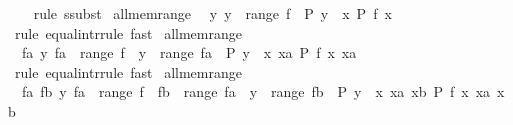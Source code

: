 \begin{isabellebody}
%
\isadelimproof
\ \ %
\endisadelimproof
%
\isatagproof
{}\isamarkupfalse%
\ {\isacharparenleft}{\kern0pt}rule\ ssubst{\isacharparenright}{\kern0pt}%
\endisatagproof
{\isafoldproof}%
%
\isadelimproof
\isanewline
%
\endisadelimproof
\isanewline
{}\isamarkupfalse%
\ all{\isacharunderscore}{\kern0pt}mem{\isacharunderscore}{\kern0pt}range{}{\isacharcolon}{\kern0pt}\isanewline
\ \ {\isachardoublequoteopen}{\isacharparenleft}{\kern0pt}{\isasymAnd}y{\isachardot}{\kern0pt}\ y\ {\isasymin}\ range\ f\ {\isasymLongrightarrow}\ P\ y{\isacharparenright}{\kern0pt}\ {\isasymequiv}\ {\isacharparenleft}{\kern0pt}{\isasymAnd}x{\isachardot}{\kern0pt}\ P\ {\isacharparenleft}{\kern0pt}f\ x{\isacharparenright}{\kern0pt}{\isacharparenright}{\kern0pt}\ {\isachardoublequoteclose}\isanewline
%
\isadelimproof
\ \ %
\endisadelimproof
%
\isatagproof
{}\isamarkupfalse%
\ {\isacharparenleft}{\kern0pt}rule\ equal{\isacharunderscore}{\kern0pt}intr{\isacharunderscore}{\kern0pt}rule{\isacharparenright}{\kern0pt}\ fast{\isacharplus}{\kern0pt}%
\endisatagproof
{\isafoldproof}%
%
\isadelimproof
\isanewline
%
\endisadelimproof
\isanewline
{}\isamarkupfalse%
\ all{\isacharunderscore}{\kern0pt}mem{\isacharunderscore}{\kern0pt}range{}{\isacharcolon}{\kern0pt}\isanewline
\ \ {\isachardoublequoteopen}{\isacharparenleft}{\kern0pt}{\isasymAnd}fa\ y{\isachardot}{\kern0pt}\ fa\ {\isasymin}\ range\ f\ {\isasymLongrightarrow}\ y\ {\isasymin}\ range\ fa\ {\isasymLongrightarrow}\ P\ y{\isacharparenright}{\kern0pt}\ {\isasymequiv}\ {\isacharparenleft}{\kern0pt}{\isasymAnd}x\ xa{\isachardot}{\kern0pt}\ P\ {\isacharparenleft}{\kern0pt}f\ x\ xa{\isacharparenright}{\kern0pt}{\isacharparenright}{\kern0pt}{\isachardoublequoteclose}\isanewline
%
\isadelimproof
\ \ %
\endisadelimproof
%
\isatagproof
{}\isamarkupfalse%
\ {\isacharparenleft}{\kern0pt}rule\ equal{\isacharunderscore}{\kern0pt}intr{\isacharunderscore}{\kern0pt}rule{\isacharparenright}{\kern0pt}\ fast{\isacharplus}{\kern0pt}%
\endisatagproof
{\isafoldproof}%
%
\isadelimproof
\isanewline
%
\endisadelimproof
\isanewline
{}\isamarkupfalse%
\ all{\isacharunderscore}{\kern0pt}mem{\isacharunderscore}{\kern0pt}range{}{\isacharcolon}{\kern0pt}\isanewline
\ \ {\isachardoublequoteopen}{\isacharparenleft}{\kern0pt}{\isasymAnd}fa\ fb\ y{\isachardot}{\kern0pt}\ fa\ {\isasymin}\ range\ f\ {\isasymLongrightarrow}\ fb\ {\isasymin}\ range\ fa\ {\isasymLongrightarrow}\ y\ {\isasymin}\ range\ fb\ {\isasymLongrightarrow}\ P\ y{\isacharparenright}{\kern0pt}\ {\isasymequiv}\ {\isacharparenleft}{\kern0pt}{\isasymAnd}x\ xa\ xb{\isachardot}{\kern0pt}\ P\ {\isacharparenleft}{\kern0pt}f\ x\ xa\ xb{\isacharparenright}{\kern0pt}{\isacharparenright}{\kern0pt}{\isachardoublequoteclose}\isanewline

\end{isabellebody}
